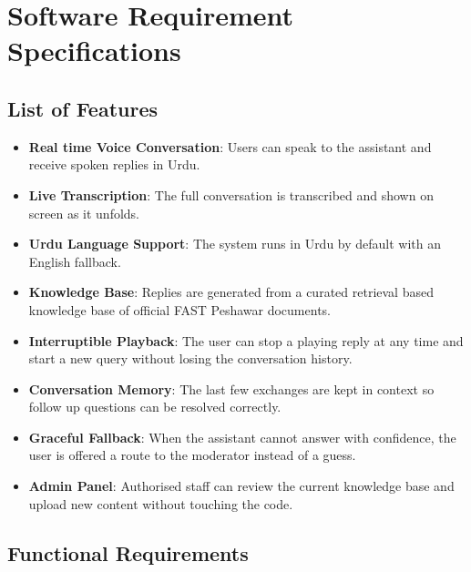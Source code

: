 \documentclass[12pt,a4paper]{report}
\begin{document}
\newpage
\section{Software Requirement Specifications}

\subsection{List of Features}

\begin{itemize}
  \item \textbf{Real time Voice Conversation}:
        Users can speak to the assistant and receive spoken replies in
        Urdu.
  \item \textbf{Live Transcription}:
        The full conversation is transcribed and shown on screen as it
        unfolds.
  \item \textbf{Urdu Language Support}:
        The system runs in Urdu by default with an English fallback.
  \item \textbf{Knowledge Base}:
        Replies are generated from a curated retrieval based knowledge
        base of official FAST Peshawar documents.
  \item \textbf{Interruptible Playback}:
        The user can stop a playing reply at any time and start a new
        query without losing the conversation history.
  \item \textbf{Conversation Memory}:
        The last few exchanges are kept in context so follow up questions
        can be resolved correctly.
  \item \textbf{Graceful Fallback}:
        When the assistant cannot answer with confidence, the user is
        offered a route to the moderator instead of a guess.
  \item \textbf{Admin Panel}:
        Authorised staff can review the current knowledge base and upload
        new content without touching the code.
\end{itemize}

\subsection{Functional Requirements}
\end{document}
